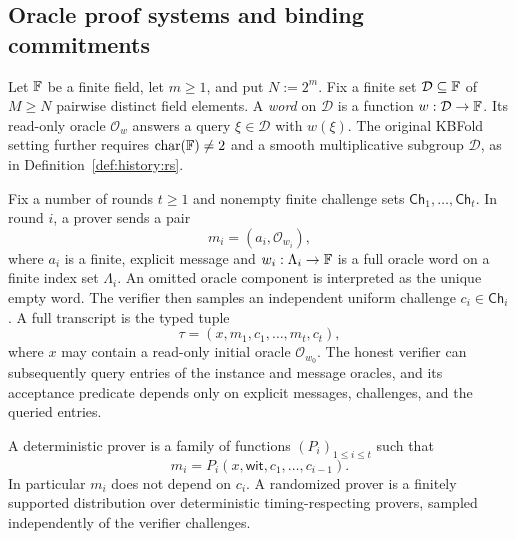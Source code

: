 \subsection{Oracle proof systems and binding commitments}\label{sec:security:oracles}

\begin{definition}\label{def:security:domain}
Let $\mathbb{F}$ be a finite field, let $m\geq1$, and put $N:=2^m$. Fix a finite set $\mathcal D\subseteq\mathbb{F}$ of $M\geq N$ pairwise distinct field elements. A \emph{word} on $\mathcal D$ is a function $w:\mathcal D\to\mathbb{F}$. Its read-only oracle $\mathcal O_w$ answers a query $\xi\in\mathcal D$ with $w(\xi)$.
The original KBFold setting further requires $\operatorname{char}(\mathbb{F})\neq2$ and a smooth multiplicative subgroup $\mathcal D$, as in Definition~\ref{def:history:rs}.
\end{definition}

\begin{definition}\label{def:security:iop}
Fix a number of rounds $t\geq1$ and nonempty finite challenge sets $\mathsf{Ch}_1,\ldots,\mathsf{Ch}_t$. In round $i$, a prover sends a pair
\[
 m_i=(a_i,\mathcal O_{w_i}),
\]
where $a_i$ is a finite, explicit message and $w_i:\Lambda_i\to\mathbb{F}$ is a full oracle word on a finite index set $\Lambda_i$. An omitted oracle component is interpreted as the unique empty word. The verifier then samples an independent uniform challenge $c_i\in\mathsf{Ch}_i$.
A full transcript is the typed tuple
\[
 \tau=(x,m_1,c_1,\ldots,m_t,c_t),
\]
where $x$ may contain a read-only initial oracle $\mathcal O_{w_0}$. The honest verifier can subsequently query entries of the instance and message oracles, and its acceptance predicate depends only on explicit messages, challenges, and the queried entries.
\end{definition}

\begin{definition}\label{def:security:causal-prover}
A deterministic prover is a family of functions $(P_i)_{1\leq i\leq t}$ such that
\[
 m_i=P_i(x,\mathsf{wit},c_1,\ldots,c_{i-1}).
\]
In particular $m_i$ does not depend on $c_i$. A randomized prover is a finitely supported distribution over deterministic timing-respecting provers, sampled independently of the verifier challenges.
\end{definition}

